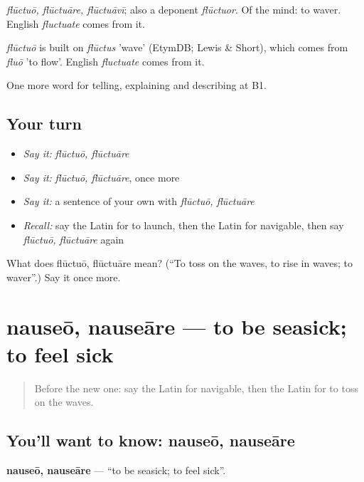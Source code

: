 \emph{flūctuō, flūctuāre, flūctuāvī}; also a deponent \emph{flūctuor}. Of the mind: to waver. English \emph{fluctuate} comes from it.

\begin{cousinweb}
\emph{flūctuō} is built on \emph{flūctus} 'wave' (EtymDB; Lewis \& Short), which comes from \emph{fluō} 'to flow'. English \emph{fluctuate} comes from it.
\end{cousinweb}

\begin{grammarlens}[title={What you've built}]
One more word for telling, explaining and describing at B1.
\end{grammarlens}

\subsection*{Your turn}
\begin{itemize}
\raggedright
  \item \emph{Say it:} \emph{flūctuō, flūctuāre}
  \item \emph{Say it:} \emph{flūctuō, flūctuāre}, once more
  \item \emph{Say it:} a sentence of your own with \emph{flūctuō, flūctuāre}
  \item \emph{Recall:} say the Latin for to launch, then the Latin for navigable, then say \emph{flūctuō, flūctuāre} again
\end{itemize}

\begin{tcolorbox}[breakable,colback=teal!4,colframe=teal!35!black,title={Before you move on}]
What does flūctuō, flūctuāre mean? (\textquotedblleft{}To toss on the waves, to rise in waves; to waver\textquotedblright{}.) Say it once more.
\end{tcolorbox}
\section[nauseō, nauseāre]{nauseō, nauseāre — to be seasick; to feel sick}

\label{lesson:LA-C440-nauseo}



\begin{quote}
Before the new one: say the Latin for navigable, then the Latin for to toss on the waves.
\end{quote}

\subsection*{You'll want to know: nauseō, nauseāre}
\textbf{nauseō, nauseāre} — \textquotedblleft{}to be seasick; to feel sick\textquotedblright{}.


